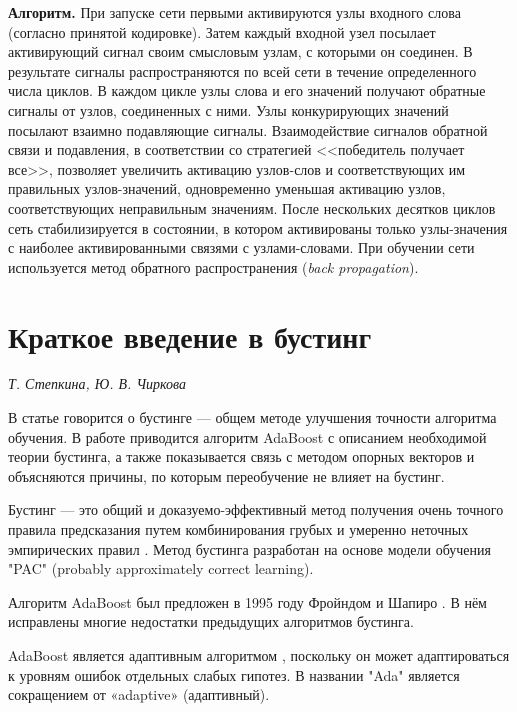 \documentclass{article}
\begin{document}
\begin{articletext}
\textbf{Алгоритм.} При запуске сети первыми активируются узлы входного  слова  (согласно принятой кодировке). Затем  каждый  входной узел посылает активирующий сигнал своим смысловым узлам, с которыми он соединен. В результате  сигналы распространяются по всей сети в течение определенного числа циклов. В каждом цикле узлы слова и  его значений получают обратные сигналы от узлов, соединенных с ними. Узлы конкурирующих значений посылают взаимно подавляющие сигналы.  Взаимодействие  сигналов  обратной  связи  и  подавления,  в соответствии со стратегией <<победитель получает все>>, позволяет увеличить активацию узлов-слов и соответствующих им правильных узлов-значений,  одновременно  уменьшая  активацию  узлов,  соответствующих неправильным значениям. После нескольких десятков  циклов сеть стабилизируется  в  состоянии, в котором активированы  только узлы-значения с наиболее активированными связями  с    узлами-словами. При обучении сети  используется  метод  обратного  распространения (\textit{back  propagation}).

\section{Краткое введение в бустинг}

\begin{flushright}
\textit{Т. Степкина, Ю. В. Чиркова}
\end{flushright} 

В статье \cite{Freund 1999} говорится о бустинге --- общем методе улучшения точности алгоритма обучения. В работе приводится алгоритм AdaBoost с описанием необходимой теории бустинга, а также показывается связь с методом опорных векторов и объясняются причины, по которым переобучение не влияет на бустинг.  

Бустинг --- это общий и доказуемо-эффективный метод получения очень точного правила предсказания путем комбинирования грубых и умеренно неточных эмпирических правил \cite{Freund 1999}. Метод бустинга разработан на основе модели обучения "PAC" (probably approximately correct learning).

Алгоритм AdaBoost был предложен в 1995 году Фройндом и Шапиро \cite{Freund 1996}. В нём исправлены многие недостатки предыдущих алгоритмов бустинга.

AdaBoost является адаптивным алгоритмом \cite{Freund 1999}, поскольку он может адаптироваться к уровням ошибок отдельных слабых гипотез. В названии "Ada" является сокращением от «adaptive» (адаптивный).


\end{articletext}
\end{document}
